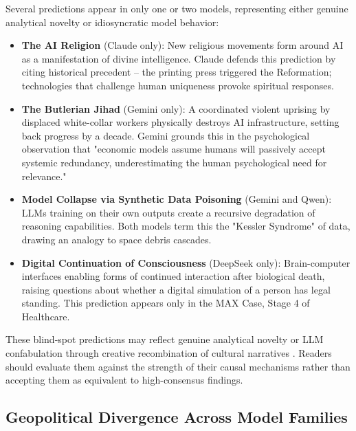\documentclass[preprint,review,12pt]{elsarticle}
\begin{document}
Several predictions appear in only one or two models, representing either genuine analytical novelty or idiosyncratic model behavior:

\begin{itemize}
  \item \textbf{The AI Religion} (Claude only): New religious movements form around AI as a manifestation of divine intelligence. Claude defends this prediction by citing historical precedent -- the printing press triggered the Reformation; technologies that challenge human uniqueness provoke spiritual responses.
  \item \textbf{The Butlerian Jihad} (Gemini only): A coordinated violent uprising by displaced white-collar workers physically destroys AI infrastructure, setting back progress by a decade. Gemini grounds this in the psychological observation that "economic models assume humans will passively accept systemic redundancy, underestimating the human psychological need for relevance."
  \item \textbf{Model Collapse via Synthetic Data Poisoning} (Gemini and Qwen): LLMs training on their own outputs create a recursive degradation of reasoning capabilities. Both models term this the "Kessler Syndrome" of data, drawing an analogy to space debris cascades.
  \item \textbf{Digital Continuation of Consciousness} (DeepSeek only): Brain-computer interfaces enabling forms of continued interaction after biological death, raising questions about whether a digital simulation of a person has legal standing. This prediction appears only in the MAX Case, Stage 4 of Healthcare.

\end{itemize}

These blind-spot predictions may reflect genuine analytical novelty or LLM confabulation through creative recombination of cultural narratives \citep{postma2005scenario}. Readers should evaluate them against the strength of their causal mechanisms rather than accepting them as equivalent to high-consensus findings.

\subsection{Geopolitical Divergence Across Model Families}
\label{sec:geopolitical_divergence}
\end{document}
